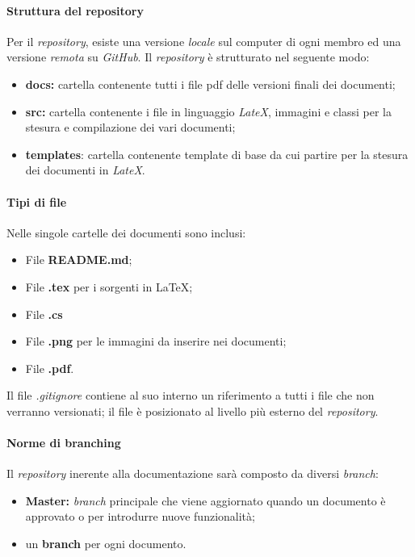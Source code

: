 		\paragraph{Struttura del repository}
			Per il \emph{repository}, esiste una versione \emph{locale} sul computer di ogni membro ed una versione \emph{remota} su \emph{GitHub}.\newline
			Il \emph{repository} è strutturato nel seguente modo:
			\begin{itemize}
				\item \textbf{docs:} cartella contenente tutti i file pdf delle versioni finali dei documenti; 
				\item \textbf{src:} cartella contenente i file in linguaggio \emph{LateX}, immagini e classi per la stesura e compilazione dei vari documenti;
				\item \textbf{templates}: cartella contenente template di base da cui partire per la stesura dei documenti in \emph{LateX}.
			\end{itemize}
		\paragraph{Tipi di file}	%
			Nelle singole cartelle dei documenti sono inclusi:
			\begin{itemize}
				\item File \textbf{README.md};
				\item File \textbf{.tex} per i sorgenti in \LaTeX; 
				\item File \textbf{.cs} %
				\item File \textbf{.png} per le immagini da inserire nei documenti;
				\item File \textbf{.pdf}. %
			\end{itemize}
			Il file \emph{.gitignore} contiene al suo interno un riferimento a tutti i file che non verranno versionati; il file è posizionato al livello più esterno del \emph{repository}.
		\paragraph{Norme di branching}
			Il \emph{repository} inerente alla documentazione sarà composto da diversi \emph{branch}:
			\begin{itemize}
				\item \textbf{Master:} \emph{branch} principale che viene aggiornato quando un documento è approvato o per introdurre nuove funzionalità; 
				\item un \textbf{branch} per ogni documento. %
			\end{itemize}
		
